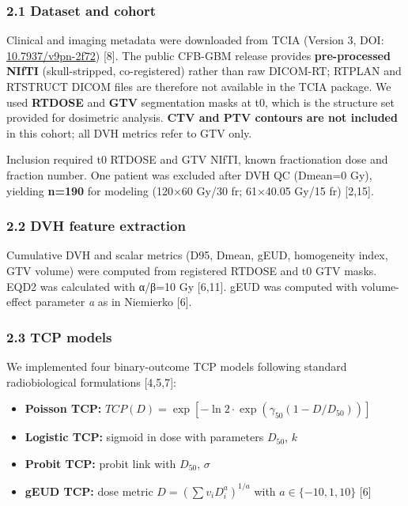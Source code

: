 \documentclass[
  11pt,
]{article}
\providecommand{\tightlist}{%
  \setlength{\itemsep}{0pt}\setlength{\parskip}{0pt}}
\begin{document}
\subsubsection{2.1 Dataset and cohort}\label{dataset-and-cohort}

Clinical and imaging metadata were downloaded from TCIA (Version 3, DOI:
\href{https://doi.org/10.7937/v9pn-2f72}{10.7937/v9pn-2f72}) {[}8{]}.
The public CFB-GBM release provides \textbf{pre-processed NIfTI}
(skull-stripped, co-registered) rather than raw DICOM-RT; RTPLAN and
RTSTRUCT DICOM files are therefore not available in the TCIA package. We
used \textbf{RTDOSE} and \textbf{GTV} segmentation masks at t0, which is
the structure set provided for dosimetric analysis. \textbf{CTV and PTV
contours are not included} in this cohort; all DVH metrics refer to GTV
only.

Inclusion required t0 RTDOSE and GTV NIfTI, known fractionation dose and
fraction number. One patient was excluded after DVH QC (Dmean=0 Gy),
yielding \textbf{n=190} for modeling (120×60 Gy/30 fr; 61×40.05 Gy/15
fr) {[}2,15{]}.

\subsubsection{2.2 DVH feature extraction}\label{dvh-feature-extraction}

Cumulative DVH and scalar metrics (D95, Dmean, gEUD, homogeneity index,
GTV volume) were computed from registered RTDOSE and t0 GTV masks. EQD2
was calculated with α/β=10 Gy {[}6,11{]}. gEUD was computed with
volume-effect parameter \emph{a} as in Niemierko {[}6{]}.

\subsubsection{2.3 TCP models}\label{tcp-models}

We implemented four binary-outcome TCP models following standard
radiobiological formulations {[}4,5,7{]}:

\begin{itemize}
\tightlist
\item
  \textbf{Poisson TCP:}
  \(TCP(D) = \exp\!\left[-\ln 2 \cdot \exp\left(\gamma_{50}(1 - D/D_{50})\right)\right]\)
\item
  \textbf{Logistic TCP:} sigmoid in dose with parameters \(D_{50}\),
  \(k\)
\item
  \textbf{Probit TCP:} probit link with \(D_{50}\), \(\sigma\)
\item
  \textbf{gEUD TCP:} dose metric
  \(D = \left(\sum v_i D_i^a\right)^{1/a}\) with \(a \in \{-10,1,10\}\)
  {[}6{]}
\end{itemize}
\end{document}
